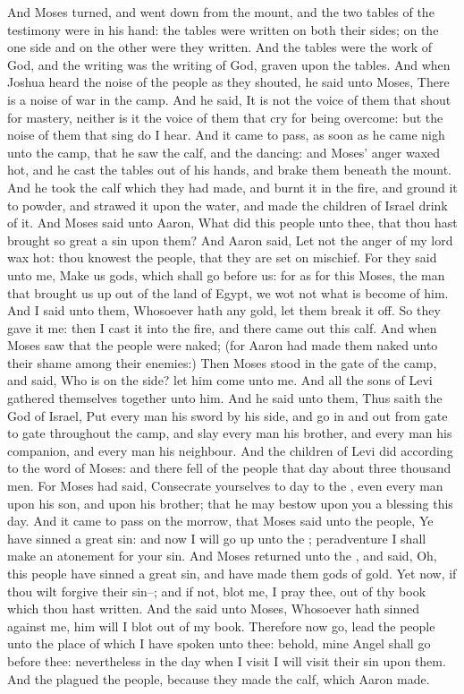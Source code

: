 \begin{biblechapter}
\verse And Moses turned, and went down from the mount, and the two tables of the testimony were in his hand: the tables were written on both their sides; on the one side and on the other were they written.
\verse And the tables were the work of God, and the writing was the writing of God, graven upon the tables.
\verse And when Joshua heard the noise of the people as they shouted, he said unto Moses, There is a noise of war in the camp.
\verse And he said, It is not the voice of them that shout for mastery, neither is it the voice of them that cry for being overcome: but the noise of them that sing do I hear.
\verse And it came to pass, as soon as he came nigh unto the camp, that he saw the calf, and the dancing: and Moses' anger waxed hot, and he cast the tables out of his hands, and brake them beneath the mount.
\verse And he took the calf which they had made, and burnt it in the fire, and ground it to powder, and strawed it upon the water, and made the children of Israel drink of it.
\verse And Moses said unto Aaron, What did this people unto thee, that thou hast brought so great a sin upon them?
\verse And Aaron said, Let not the anger of my lord wax hot: thou knowest the people, that they are set on mischief.
\verse For they said unto me, Make us gods, which shall go before us: for as for this Moses, the man that brought us up out of the land of Egypt, we wot not what is become of him.
\verse And I said unto them, Whosoever hath any gold, let them break it off. So they gave it me: then I cast it into the fire, and there came out this calf.
\verse And when Moses saw that the people were naked; (for Aaron had made them naked unto their shame among their enemies:)
\verse Then Moses stood in the gate of the camp, and said, Who is on the \LORDs side? let him come unto me. And all the sons of Levi gathered themselves together unto him.
\verse And he said unto them, Thus saith the \LORD God of Israel, Put every man his sword by his side, and go in and out from gate to gate throughout the camp, and slay every man his brother, and every man his companion, and every man his neighbour.
\verse And the children of Levi did according to the word of Moses: and there fell of the people that day about three thousand men.
\verse For Moses had said, Consecrate yourselves to day to the \LORD, even every man upon his son, and upon his brother; that he may bestow upon you a blessing this day.
\verse And it came to pass on the morrow, that Moses said unto the people, Ye have sinned a great sin: and now I will go up unto the \LORD; peradventure I shall make an atonement for your sin.
\verse And Moses returned unto the \LORD, and said, Oh, this people have sinned a great sin, and have made them gods of gold.
\verse Yet now, if thou wilt forgive their sin--; and if not, blot me, I pray thee, out of thy book which thou hast written.
\verse And the \LORD said unto Moses, Whosoever hath sinned against me, him will I blot out of my book.
\verse Therefore now go, lead the people unto the place of which I have spoken unto thee: behold, mine Angel shall go before thee: nevertheless in the day when I visit I will visit their sin upon them.
\verse And the \LORD plagued the people, because they made the calf, which Aaron made.
\end{biblechapter}

